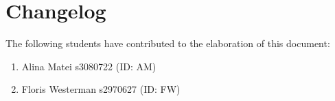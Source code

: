 \section{Changelog}

The following students have contributed to the elaboration of this document:
\begin{enumerate}
     \item Alina Matei s3080722 (ID: AM)
    \item Floris Westerman s2970627 (ID: FW)
\end{enumerate}


